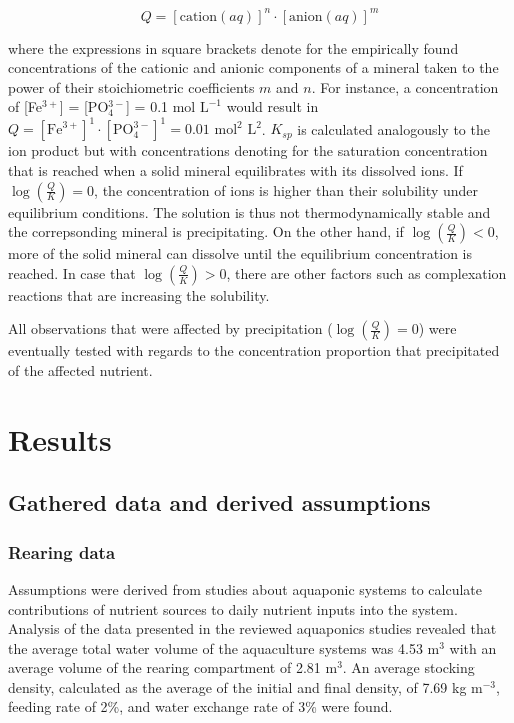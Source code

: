 \documentclass[
]{article}
\begin{document}
\[
Q = [\text{cation}(aq)]^n \cdot [\text{anion}(aq)]^m
\]

where the expressions in square brackets denote for the empirically found concentrations of the cationic and anionic components of a mineral taken to the power of their stoichiometric coefficients \(m\) and \(n\). For instance, a concentration of {[}Fe\(^{3+}\){]} = {[}PO\(_{4}^{3-}\){]} = 0.1 mol \(\text{L}^{-1}\) would result in \(Q = [\text{Fe}^{3+}]^1 \cdot [\text{PO}_{4}^{3-}]^1 = 0.01 \text{ mol}^2 \text{ L}^2\). \(K_{sp}\) is calculated analogously to the ion product but with concentrations denoting for the saturation concentration that is reached when a solid mineral equilibrates with its dissolved ions. If \(\log(\frac{Q}{K}) = 0\), the concentration of ions is higher than their solubility under equilibrium conditions. The solution is thus not thermodynamically stable and the correpsonding mineral is precipitating. On the other hand, if \(\log(\frac{Q}{K}) < 0\), more of the solid mineral can dissolve until the equilibrium concentration is reached. In case that \(\log(\frac{Q}{K}) > 0\), there are other factors such as complexation reactions that are increasing the solubility.

All observations that were affected by precipitation (\(\log(\frac{Q}{K}) = 0\)) were eventually tested with regards to the concentration proportion that precipitated of the affected nutrient.

\hypertarget{results}{%
\section{Results}\label{results}}

\hypertarget{gathered-data-and-derived-assumptions}{%
\subsection{Gathered data and derived assumptions}\label{gathered-data-and-derived-assumptions}}

\hypertarget{rearing-data}{%
\subsubsection{Rearing data}\label{rearing-data}}

Assumptions were derived from studies about aquaponic systems to calculate contributions of nutrient sources to daily nutrient inputs into the system.
Analysis of the data presented in the reviewed aquaponics studies revealed that the average total water volume of the aquaculture systems was 4.53 m\(^{3}\) with an average volume of the rearing compartment of 2.81 m\(^3\). An average stocking density, calculated as the average of the initial and final density, of 7.69 kg m\(^{-3}\), feeding rate of 2\%, and water exchange rate of 3\% were found.
\end{document}
